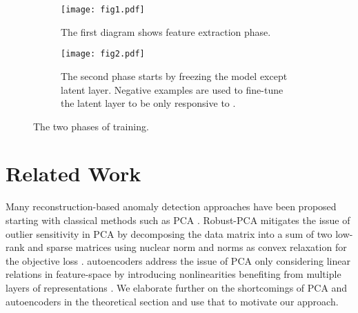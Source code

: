 \documentclass[acmtog, nonacm]{acmart}
\begin{document}
\begin{figure}
 \begin{subfigure}{\linewidth}
    \centering
    \texttt{[image: fig1.pdf]} 
    \caption{The first diagram shows feature extraction phase.} 
    \label{fig1:a} 
    \vspace{0ex}
  \end{subfigure}

  \begin{subfigure}{\linewidth}
    \centering
    \texttt{[image: fig2.pdf]} 
    \caption{The second phase starts by freezing the model except latent layer. Negative examples  are used to fine-tune the latent layer to be only responsive to .} 
    \label{fig1:b} 
    \vspace{0ex}
  \end{subfigure}
  \caption{The two phases of training.}
    \label{fig:fig1}
\end{figure}

\section{Related Work}

Many reconstruction-based anomaly detection approaches have been proposed starting with classical methods such as PCA \cite{pearson1901liii}. Robust-PCA mitigates the issue of outlier sensitivity in PCA by decomposing the data matrix into a sum of two low-rank and sparse matrices using nuclear norm and  norms as convex relaxation for the objective loss \cite{candes2011robust}. autoencoders address the issue of PCA only considering linear relations in feature-space by introducing nonlinearities benefiting from multiple layers of representations \cite{bourlard1988auto}. We elaborate further on the shortcomings of PCA and autoencoders in the theoretical section and use that to motivate our approach. 
 
\end{document}
